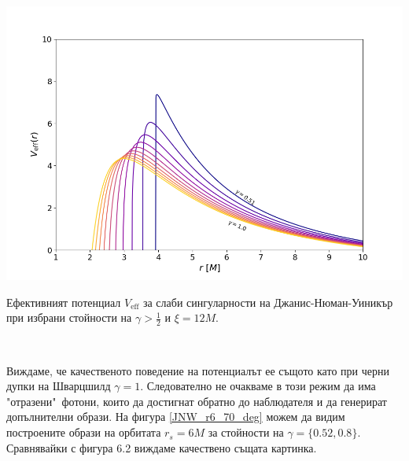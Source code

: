 \begin{minipage}{18em}
	\hspace{-0.5cm}
	\includegraphics[scale = 0.3]{JNW_eff_potential_photon_sphere.png}
	\caption[Ефективният потенциал за слаби сингуларности на Джанис-Нюман-Уиникър]{Ефективният потенциал $V_\text{eff}$ за слаби сингуларности на Джанис-Нюман-Уиникър при избрани стойности на $\gamma > \frac{1}{2}$ и $\xi = 12M$.}
\end{minipage}\,\,
\begin{minipage}{16em}
	Виждаме, че качественото поведение на потенциалът ее същото като при черни дупки на Шварцшилд $\gamma = 1$. Следователно не очакваме в този режим да има "отразени"$\,$ фотони, които да достигнат обратно до наблюдателя и да генерират допълнителни образи. На фигура \ref{JNW_r6_70_deg} можем да видим построените образи на орбитата $r_s = 6M$ за стойности на $\gamma = \{0.52, 0.8\}$. Сравнявайки с фигура 6.2 виждаме качествено същата картинка.
\end{minipage}

